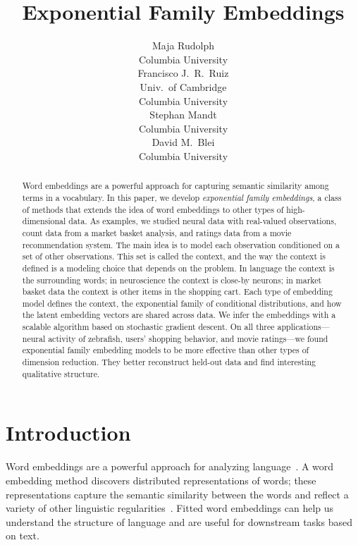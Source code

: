 \documentclass[12pt]{article}
\title{Exponential Family Embeddings}
\author{
  Maja Rudolph\\
  Columbia University\\
  \And
  Francisco J.\ R.\ Ruiz\\
  Univ.\ of Cambridge \\
  Columbia University\\ 
  \And
  Stephan Mandt\\
  Columbia University\\
  \And
  David M.\ Blei\\
  Columbia University\\
}
\begin{document}
\maketitle

\begin{abstract}
  Word embeddings are a powerful approach for capturing semantic
  similarity among terms in a vocabulary.  In this paper, we develop
  \textit{exponential family embeddings}, a class of methods that
  extends the idea of word embeddings to other types of
  high-dimensional data. As examples, we studied neural data with
  real-valued observations, count data from a market basket analysis,
  and ratings data from a movie recommendation system.  The main idea
  is to model each observation conditioned on a set of other
  observations.  This set is called the context, and the way the
  context is defined is a modeling choice that depends on the problem.
  In language the context is the surrounding words; in neuroscience
  the context is close-by neurons; in market basket data the context
  is other items in the shopping cart.  Each type of embedding model
  defines the context, the exponential family of conditional
  distributions, and how the latent embedding vectors are shared
  across data. We infer the embeddings with a scalable algorithm based
  on stochastic gradient descent. On all three applications---neural
  activity of zebrafish, users' shopping behavior, and movie
  ratings---we found exponential family embedding models to be more
  effective than other types of dimension reduction.  They better
  reconstruct held-out data and find interesting qualitative
  structure.
\end{abstract}

\section{Introduction}

Word embeddings are a powerful approach for analyzing
language~\citep{bengio2006neural,mikolov2013efficient,mikolov2013distributed,pennington2014glove}.
A word embedding method discovers distributed representations of
words; these representations capture the semantic similarity between
the words and reflect a variety of other linguistic
regularities~\citep{rumelhart1986learning,bengio2006neural,mikolov2013linguistic}.
Fitted word embeddings can help us understand the structure of
language and are useful for downstream tasks based on text.
\end{document}
